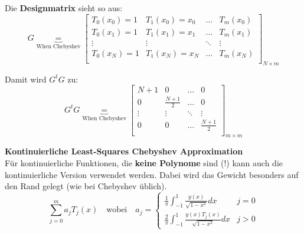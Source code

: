 Die \textbf{Designmatrix} sieht so aus:
$$G \underbrace{=}_{\text{When Chebyshev}} 
\begin{bmatrix}
  T_0(x_0) = 1 & T_1(x_0) = x_0 & \ldots & T_m(x_0) \\
  T_0(x_1) = 1 & T_1(x_1) = x_1 & \ldots & T_m(x_1)\\
  \vdots & \vdots  & \ddots & \vdots\\
  T_0(x_N) = 1 & T_1(x_N) =x_N & \ldots & T_m(x_N)\\
\end{bmatrix}_{N \times m}$$

Damit wird $G^t G$ zu:
$$G^t G \underbrace{=}_{\text{When Chebyshev}} 
\begin{bmatrix}
  N+1 & 0 & \ldots & 0 \\
  0   & \frac{N+1}{2} & \ldots & 0\\
  \vdots  & \vdots & \ddots & \vdots\\
  0   & 0 & \ldots & \frac{N+1}{2}\\
\end{bmatrix}_{m \times m}$$


\textbf{Kontinuierliche Least-Squares Chebyshev Approximation}\\
Für kontinuierliche Funktionen, die \textbf{keine Polynome} sind (!) kann auch die kontinuierliche Version
verwendet werden. Dabei wird das Gewicht besonders auf den Rand gelegt (wie bei Chebyshev üblich).
$$\sum_{j=0}^m a_j T_j(x) \quad \text{wobei} \quad
a_j = \begin{cases}
  \frac{1}{\pi} \int_{-1}^1 \frac{y(x)}{\sqrt{1-x^2}} dx & j = 0\\
  \frac{2}{\pi} \int_{-1}^1 \frac{y(x) T_j(x)}{\sqrt{1-x^2}} dx & j > 0 
\end{cases}$$